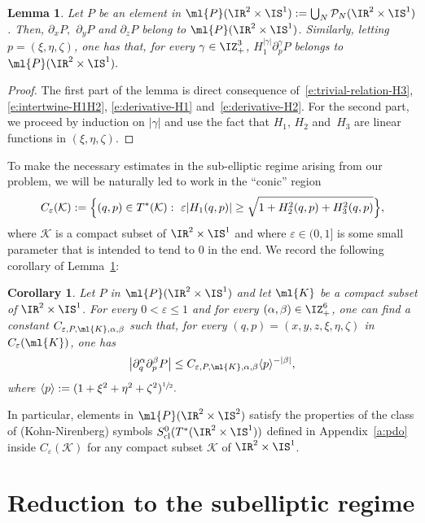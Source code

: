 \documentclass[10pt]{amsart}
\theoremstyle{plain}
\newtheorem{coro}[theo]{Corollary}
\newtheorem{lemm}[theo]{Lemma}
\theoremstyle{definition}
\theoremstyle{remark}
\begin{document}
\begin{lemm}\label{l:polynomial} Let $P$ be an element in $\ml{P}(\IR^2\times\IS^1) := \bigcup_N \mathcal{P}_N(\IR^2\times\IS^1)$. Then, $\partial_xP,$ $ \partial_yP$ and $\partial_z P$
belong to $\ml{P}(\IR^2\times\IS^1)$. Similarly, letting $p=(\xi,\eta,\zeta)$, one has that, for every $\gamma\in\IZ_+^3$,
$H_1^{|\gamma|}\partial_{p}^{\gamma}P$
belongs to $\ml{P}(\IR^2\times\IS^1).$
\end{lemm}

\begin{proof}
The first part of the lemma is direct consequence of~\eqref{e:trivial-relation-H3}, \eqref{e:intertwine-H1H2}, \eqref{e:derivative-H1} and~\eqref{e:derivative-H2}. For the second part, we proceed by induction on $|\gamma|$ and use the fact that $H_1$, $H_2$ and~$H_3$ are linear functions in $(\xi,\eta,\zeta)$.
\end{proof}

To make the necessary estimates in the sub-elliptic regime arising from our problem, we will be naturally led to work in the ``conic'' region
\begin{equation}%
C_\varepsilon(\mathcal{K}):=\Bigl\{(q,p)\in T^*(\mathcal{K}):\ \varepsilon |H_1(q,p)|\geq \sqrt{1+H_2^2(q,p)+H_3^2(q,p)}\Bigr\},
\end{equation}
where $\mathcal{K}$ is a compact subset of $\IR^2\times\IS^1$ and where $\varepsilon\in(0,1]$ is some small parameter that is intended to tend to $0$ in the end. We record the following corollary of Lemma~\ref{l:polynomial}:
\begin{coro}\label{c:derivative-cone} Let $P$ in $\ml{P}(\IR^2\times\IS^1)$ and let $\ml{K}$ be a compact subset of $\IR^2\times\IS^1$. For every $0<\varepsilon\leq 1$ and for every $(\alpha,\beta)\in\IZ_+^6$, one can find a constant $C_{\varepsilon, P, \ml{K}, \alpha,\beta}$ such that, for every $(q,p)=(x,y,z,\xi,\eta,\zeta)$ in $C_\varepsilon(\ml{K})$, one has
\[
\left|\partial^\alpha_{q}\partial_{p}^\beta P\right|\leq C_{\varepsilon,P, \ml{K},\alpha,\beta}\langle p\rangle^{-|\beta|},
\]
where $\langle p\rangle:=(1+\xi^2+\eta^2+\zeta^2)^{\sfrac{1}{2}}.$
\end{coro}
In particular, elements in $\ml{P}(\IR^2\times\IS^2)$ satisfy the properties of the class of (Kohn-Nirenberg) symbols $S^0_{\textup{cl}}(T^*(\IR^2\times\IS^1))$ defined in Appendix~\ref{a:pdo} inside $C_\varepsilon(\mathcal{K})$ for any compact subset $\mathcal{K}$ of $\IR^2\times\IS^1$.

\section{Reduction to the subelliptic regime}\label{s:cutoff}
\end{document}
